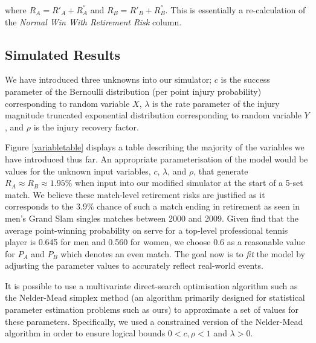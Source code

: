 \documentclass[authoryear, 12pt]{elsarticle}
\begin{document}
where $R_A = R'_A + R^{''}_A$ and $R_B = R'_B + R^{''}_B$.  This is essentially a re-calculation of the \textit{Normal Win With Retirement Risk} column.

\subsection{Simulated Results}

We have introduced three unknowns into our simulator; $c$ is the success parameter of the Bernoulli distribution (per point injury probability) corresponding to random variable $X$, $\lambda$ is the rate parameter of the injury magnitude truncated exponential distribution corresponding to random variable $Y$, and $\rho$ is the injury recovery factor.

Figure \ref{variabletable} displays a table describing the majority of the variables we have introduced thus far.  An appropriate parameterisation of the model would be values for the unknown input variables, $c$, $\lambda$, and $\rho$, that generate $R_A \approx R_B \approx 1.95\%$ when input into our modified simulator at the start of a 5-set match.  We believe these match-level retirement risks are justified as it corresponds to the 3.9\% chance of such a match ending in retirement as seen in men's Grand Slam singles matches between 2000 and 2009.  Given \cite{dominance} find that the average point-winning probability on serve for a top-level professional tennis player is 0.645 for men and 0.560 for women, we choose 0.6 as a reasonable value for $P_A$ and $P_B$ which denotes an even match.  The goal now is to \textit{fit} the model by adjusting the parameter values to accurately reflect real-world events.

It is possible to use a multivariate direct-search optimisation algorithm such as the Nelder-Mead simplex method (an algorithm primarily designed for statistical parameter estimation problems such as ours) to approximate a set of values for these parameters.  Specifically, we used a constrained version of the Nelder-Mead algorithm in order to ensure logical bounds $0 < c, \rho < 1$ and $\lambda > 0$.
\end{document}
